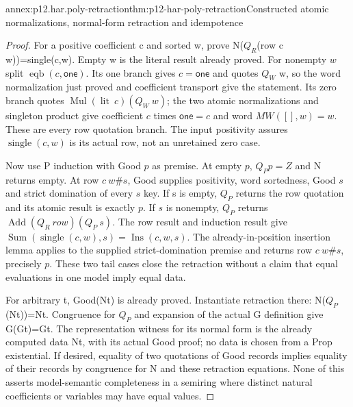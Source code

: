 \begin{annexitem}{annex:p12.har.poly-retraction}{thm:p12-har-poly-retraction}{Constructed atomic normalizations, normal-form retraction and idempotence}
\begin{proof}
For a positive coefficient c and sorted w, prove
N(\(Q_R\)(row c w))=single(c,w). Empty w is the literal result already
proved. For nonempty \(w\) split \(\operatorname{eqb}(c,\mathsf{one})\). Its one branch gives \(c=\mathsf{one}\)
and quotes \(Q_W\) w, so the word normalization just proved and coefficient
transport give the statement. Its zero branch quotes \(\operatorname{Mul}(\operatorname{lit}\ c)(Q_W\ w)\);
the two atomic normalizations and singleton product give coefficient
\(c\) times \(\mathsf{one}=c\) and word \(MW([],w)=w\). These are every row quotation
branch. The input positivity assures \(\operatorname{single}(c,w)\) is its actual row,
not an unretained zero case.

Now use P induction with Good \(p\) as premise. At empty \(p\), \(Q_Pp=Z\)
and N returns empty. At row \(c\ w \# s\), Good supplies positivity,
word sortedness, Good \(s\) and strict domination of every \(s\) key.
If s is empty, \(Q_P\) returns the row quotation and its atomic result
is exactly \(p\). If \(s\) is nonempty, \(Q_P\) returns \(\operatorname{Add}(Q_R\ \mathit{row})(Q_P\ s)\).
The row result and induction result give
\(\operatorname{Sum}(\operatorname{single}(c,w),s)=\operatorname{Ins}(c,w,s)\). The already-in-position insertion
lemma applies to the supplied strict-domination premise and returns
row \(c\ w \# s\), precisely \(p\). These two tail cases close the retraction
without a claim that equal evaluations in one model imply equal data.

For arbitrary t, Good(Nt) is already proved. Instantiate retraction
there: N(\(Q_P\)(Nt))=Nt. Congruence for \(Q_P\) and expansion of the actual
G definition give G(Gt)=Gt. The representation witness for its normal
form is the already computed data Nt, with its actual Good proof;
no data is chosen from a Prop existential. If desired, equality of
two quotations of Good records implies equality of their records
by congruence for N and these retraction equations. None of this
asserts model-semantic completeness in a semiring where distinct
natural coefficients or variables may have equal values.
\end{proof}
\end{annexitem}

